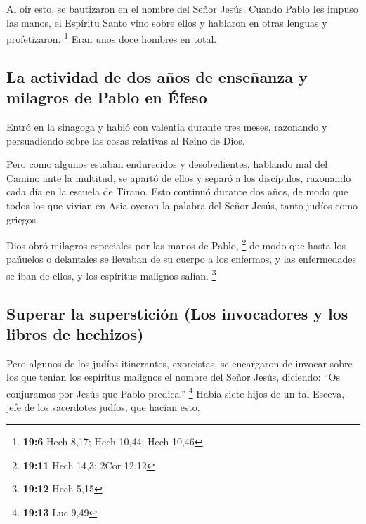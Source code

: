  Al oír esto, se bautizaron en el nombre del Señor Jesús.
 Cuando Pablo les impuso las manos, el Espíritu Santo vino
sobre ellos y hablaron en otras lenguas y profetizaron. \footnote{\textbf{19:6}
  Hech 8,17; Hech 10,44; Hech 10,46}  Eran unos doce
hombres en total.

\hypertarget{la-actividad-de-dos-auxf1os-de-enseuxf1anza-y-milagros-de-pablo-en-uxe9feso}{%
\subsection{La actividad de dos años de enseñanza y milagros de Pablo en
Éfeso}\label{la-actividad-de-dos-auxf1os-de-enseuxf1anza-y-milagros-de-pablo-en-uxe9feso}}

 Entró en la sinagoga y habló con valentía durante tres
meses, razonando y persuadiendo sobre las cosas relativas al Reino de
Dios.

 Pero como algunos estaban endurecidos y desobedientes,
hablando mal del Camino ante la multitud, se apartó de ellos y separó a
los discípulos, razonando cada día en la escuela de Tirano.
 Esto continuó durante dos años, de modo que todos los
que vivían en Asia oyeron la palabra del Señor Jesús, tanto judíos como
griegos.

 Dios obró milagros especiales por las manos de Pablo,
\footnote{\textbf{19:11} Hech 14,3; 2Cor 12,12}  de modo
que hasta los pañuelos o delantales se llevaban de su cuerpo a los
enfermos, y las enfermedades se iban de ellos, y los espíritus malignos
salían. \footnote{\textbf{19:12} Hech 5,15}

\hypertarget{superar-la-supersticiuxf3n-los-invocadores-y-los-libros-de-hechizos}{%
\subsection{Superar la superstición (Los invocadores y los libros de
hechizos)}\label{superar-la-supersticiuxf3n-los-invocadores-y-los-libros-de-hechizos}}

 Pero algunos de los judíos itinerantes, exorcistas, se
encargaron de invocar sobre los que tenían los espíritus malignos el
nombre del Señor Jesús, diciendo: ``Os conjuramos por Jesús que Pablo
predica.'' \footnote{\textbf{19:13} Luc 9,49}  Había
siete hijos de un tal Esceva, jefe de los sacerdotes judíos, que hacían
esto.

